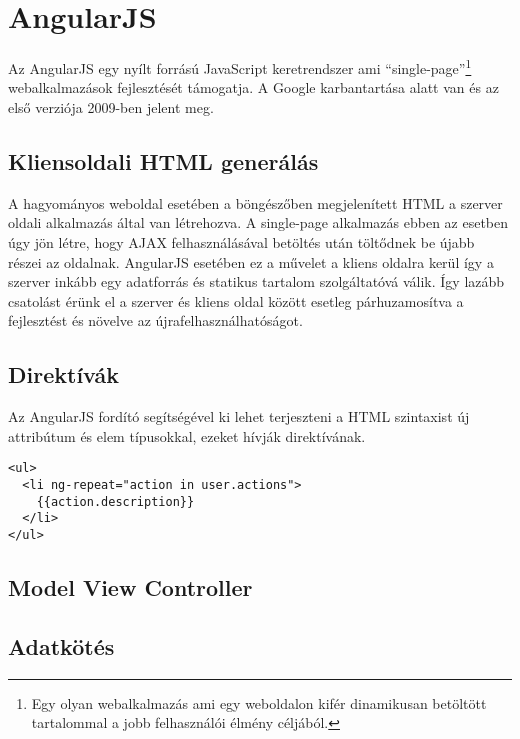 \section{AngularJS}

Az AngularJS egy nyílt forrású JavaScript keretrendszer ami ``single-page''\footnote{Egy olyan webalkalmazás ami egy weboldalon kifér dinamikusan betöltött tartalommal a jobb felhasználói élmény céljából.} webalkalmazások fejlesztését támogatja. A Google karbantartása alatt van és az első verziója 2009-ben jelent meg. 

\subsection{Kliensoldali HTML generálás}

A hagyományos weboldal esetében a böngészőben megjelenített HTML a szerver oldali alkalmazás által van létrehozva.  A single-page alkalmazás ebben az esetben úgy jön létre, hogy AJAX felhasználásával betöltés után töltődnek be újabb részei az oldalnak\cite{angularbook}. AngularJS esetében ez a művelet a kliens oldalra kerül így a szerver inkább egy adatforrás és statikus tartalom szolgáltatóvá válik. Így lazább csatolást érünk el a szerver és kliens oldal között esetleg párhuzamosítva a fejlesztést és növelve az újrafelhasználhatóságot. 


\subsection{Direktívák}

Az AngularJS fordító segítségével ki lehet terjeszteni a HTML szintaxist új attribútum és elem típusokkal, ezeket hívják direktívának. 

\lstset{language=HTML}
\begin{lstlisting}[frame=single]  
<ul>
  <li ng-repeat="action in user.actions">
    {{action.description}}
  </li>
</ul>
\end{lstlisting}

\subsection{Model View Controller}

\subsection{Adatkötés}

